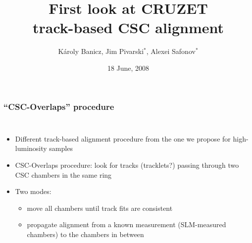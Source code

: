 \documentclass[compress]{beamer}
\title{First look at CRUZET \\ track-based CSC alignment}
\author{K\'aroly Banicz, Jim Pivarski$^*$, Alexei Safonov$^*$}
\institute{US-CMS, $^*$Texas A\&M University}
\date{18 June, 2008}
\begin{document}
\frame{\titlepage}


\begin{frame}
\frametitle{``CSC-Overlaps'' procedure}

\begin{columns}
\begin{itemize}\setlength{\itemsep}{0.2 cm}
\item Different track-based alignment procedure from the one we
propose for high-luminosity samples
\item CSC-Overlaps procedure: look for tracks (tracklets?) passing
through two CSC chambers in the same ring
\item Two modes:
\begin{itemize}
\item move all chambers until track fits are consistent
\item propagate alignment from a known measurement (SLM-measured
chambers) to the chambers in between
\end{itemize}
\end{itemize}


\end{columns}
\end{frame}
\end{document}
